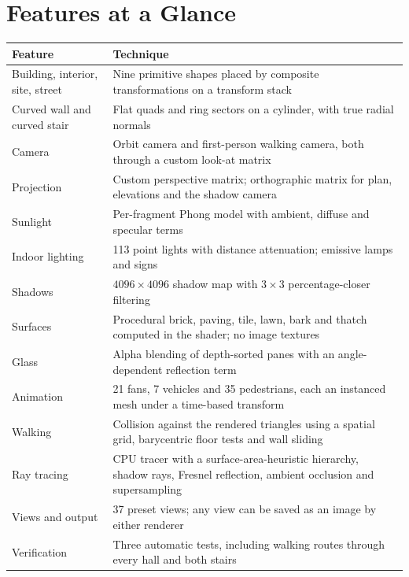 \documentclass[11pt,a4paper]{article}
\begin{document}
\section*{Features at a Glance}
\begin{table}[H]
\centering\small
\begin{tabularx}{\textwidth}{@{}L{4.2cm}X@{}}
\toprule
Feature & Technique \\
\midrule
Building, interior, site, street & Nine primitive shapes placed by composite transformations on a transform stack \\
Curved wall and curved stair & Flat quads and ring sectors on a cylinder, with true radial normals \\
Camera & Orbit camera and first-person walking camera, both through a custom look-at matrix \\
Projection & Custom perspective matrix; orthographic matrix for plan, elevations and the shadow camera \\
Sunlight & Per-fragment Phong model with ambient, diffuse and specular terms \\
Indoor lighting & 113 point lights with distance attenuation; emissive lamps and signs \\
Shadows & $4096\times4096$ shadow map with $3\times3$ percentage-closer filtering \\
Surfaces & Procedural brick, paving, tile, lawn, bark and thatch computed in the shader; no image textures \\
Glass & Alpha blending of depth-sorted panes with an angle-dependent reflection term \\
Animation & 21 fans, 7 vehicles and 35 pedestrians, each an instanced mesh under a time-based transform \\
Walking & Collision against the rendered triangles using a spatial grid, barycentric floor tests and wall sliding \\
Ray tracing & CPU tracer with a surface-area-heuristic hierarchy, shadow rays, Fresnel reflection, ambient occlusion and supersampling \\
Views and output & 37 preset views; any view can be saved as an image by either renderer \\
Verification & Three automatic tests, including walking routes through every hall and both stairs \\
\bottomrule
\end{tabularx}
\end{table}

\newpage
\setcounter{tocdepth}{2}
\tableofcontents
\newpage
\end{document}

